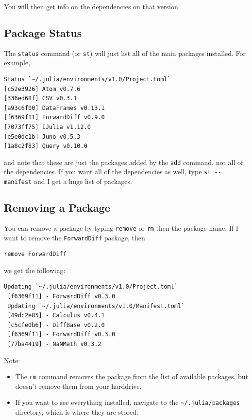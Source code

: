 You will then get info on the dependencies on that version.

\hypertarget{package-status}{%
\subsection{Package Status}\label{package-status}}

The \texttt{status} command (or \texttt{st}) will just list all of the
main packages installed. For example,

\begin{verbatim}
Status `~/.julia/environments/v1.0/Project.toml`
[c52e3926] Atom v0.7.6
[336ed68f] CSV v0.3.1
[a93c6f00] DataFrames v0.13.1
[f6369f11] ForwardDiff v0.9.0
[7073ff75] IJulia v1.12.0
[e5e0dc1b] Juno v0.5.3
[1a8c2f83] Query v0.10.0
\end{verbatim}

and note that these are just the packages added by the \texttt{add}
command, not all of the dependencies. If you want all of the
dependencies as well, type \texttt{st\ -\/-manifest} and I get a huge
list of packages.

\hypertarget{removing-a-package}{%
\subsection{Removing a Package}\label{removing-a-package}}

You can remove a package by typing \texttt{remove} or \texttt{rm} then
the package name. If I want to remove the \texttt{ForwardDiff} package,
then

\begin{verbatim}
remove ForwardDiff
\end{verbatim}

we get the following:

\begin{verbatim}
Updating `~/.julia/environments/v1.0/Project.toml`
 [f6369f11] - ForwardDiff v0.3.0
 Updating `~/.julia/environments/v1.0/Manifest.toml`
 [49dc2e85] - Calculus v0.4.1
 [c5cfe0b6] - DiffBase v0.2.0
 [f6369f11] - ForwardDiff v0.3.0
 [77ba4419] - NaNMath v0.3.2
\end{verbatim}

Note:

\begin{itemize}

\item
  The \texttt{rm} command removes the package from the list of available
  packages, but doesn't remove them from your harddrive.
\item
  If you want to see everything installed, navigate to the
  \texttt{\textasciitilde{}/.julia/packages} directory, which is where
  they are stored.
\end{itemize}


